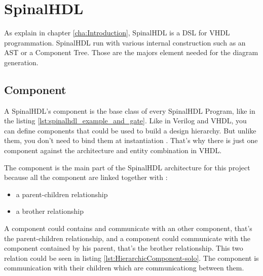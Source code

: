 
\section{SpinalHDL} %
\label{sec:SpinalHDL}

As explain in chapter \ref{cha:Introduction}, SpinalHDL is a DSL for VHDL programmation. SpinalHDL run with various internal construction such as an AST or a Component Tree. Those are the majors element needed for the diagram generation.

\subsection{Component} %
\label{sub:Component}

A SpinalHDL's component is the base class of every SpinalHDL Program, like in the listing \ref{lst:spinalhdl_example_and_gate}. Like in Verilog and VHDL, you can define components that could be used to build a design hierarchy. But unlike them, you don’t need to bind them at instantiation \cite{github-spinalhdl}. That's why there is just one component against the architecture and entity combination in VHDL.

The component is the main part of the SpinalHDL architecture for this project because all the component are linked together with :
\begin{itemize}
    \item a parent-children relationship
    \item a brother relationship
\end{itemize}

A component could contains and communicate with an other component, that's the parent-children relationship, and a component could communicate with the component contained by his parent, that's the brother relationship. This two relation could be seen in listing \ref{lst:HierarchicComponent-solo}. The component is communication with their children which are communicationg between them.

